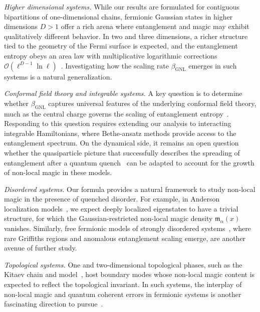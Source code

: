 \documentclass[prx,twocolumn,superscriptaddress,aps,10pt, frontmatterverbose, reprint,footinbib,longbibliography=true]{revtex4-2}
\newcommand{\RENYI}{\alpha}
\providecommand{\DIFaddtex}[1]{{\protect\color{red}#1}} %
\providecommand{\DIFaddbegin}{\protect\color{red}} %
\providecommand{\DIFaddend}{\protect\color{black}} %
\providecommand{\DIFaddtex}[1]{\texorpdfstring{\DIFaddtex{#1}}{#1}} %
\providecommand{\DIFadd}[1]{\texorpdfstring{\DIFaddtex{#1}}{#1}} %
\newcommand{\DIFaddincludegraphics}[2][]{{\color{blue}\fbox{\DIFOincludegraphics[#1]{#2}}}} %
\DeclareRobustCommand{\DIFaddbegin}{\DIFOaddbegin \let\includegraphics\DIFaddincludegraphics} %
\DeclareRobustCommand{\DIFaddend}{\DIFOaddend \let\includegraphics\DIFOincludegraphics} %
\begin{document}
\emph{Higher dimensional systems.}
While our results are formulated for \DIFaddbegin \DIFadd{contiguous }\DIFaddend bipartitions of one-dimensional chains, fermionic Gaussian states in higher dimensions $D>1$ offer a rich arena where entanglement and magic may exhibit qualitatively different behavior. In two and three dimensions, a richer structure tied to the geometry of the Fermi surface is expected, and the entanglement entropy obeys an area law with multiplicative logarithmic corrections $\mathcal{O}(\ell^{D-1}\ln\ell)$~\cite{swingle2010entanglement}. 
Investigating how the scaling rate $\beta_\mathrm{GNL}$ emerges in such systems is a natural generalization.


\emph{Conformal field theory and integrable systems.}
A key question is to determine whether $\beta_{\mathrm{GNL}}$ captures universal features of the underlying conformal field theory, much as the central charge governs the scaling of entanglement entropy~\cite{Calabrese2004entanglement}.
Responding to this question requires extending our analysis to interacting integrable Hamiltonians, where Bethe-ansatz methods provide access to the entanglement spectrum.
On the dynamical side, it remains an open question whether the quasiparticle picture that successfully describes the spreading of entanglement after a quantum quench~\cite{Alba_2017,alba2019,Kudler_Flam_2021} can be adapted to account for the growth of non-local magic in these models.

\emph{Disordered systems.}
Our formula provides a natural framework to study non-local magic in the presence of quenched disorder. 
For example, in Anderson localization models~\cite{evers,sierant2020}, we expect deeply localized eigenstates to have a trivial structure, for which the Gaussian-restricted non-local magic density $\mathfrak{m}_\RENYI(x)$ vanishes. 
Similarly, free fermionic models of strongly disordered systems~\cite{IGLOI_2005,Monthus_2018,ruggiero2022}, where rare Griffiths regions and anomalous entanglement scaling emerge, are another avenue of further study.

\emph{Topological systems.}
One and two-dimensional topological phases, such as the Kitaev chain and model~\cite{Kitaev2001chain,Kitaev_2006}, host boundary modes whose non-local magic content is expected to reflect the topological invariant.
In such systems, the interplay of non-local magic and quantum coherent errors in fermionic systems is another fascinating direction to pursue~\cite{beri,gskb-t5ql}.
\end{document}
